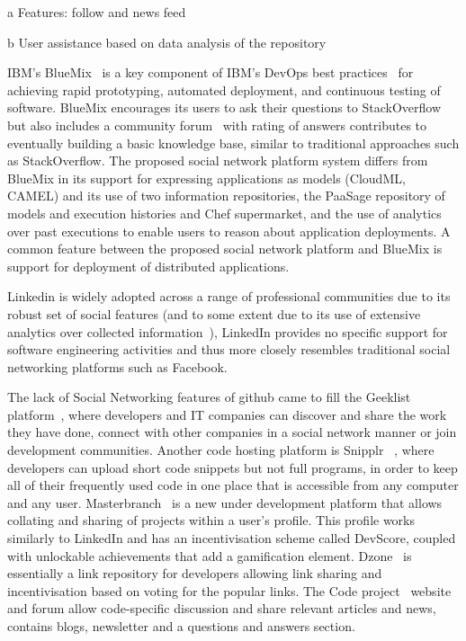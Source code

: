 \begin{table*}
\begin{threeparttable}
\begin{tabular}{c|c|c|c|c|c|c|c|c|c|cc}
\end{tabular}

\begin{tablenotes}
      \small
       \item[a] Features: follow and news feed
      \item[b] User assistance based on data analysis of the repository
\end{tablenotes}
\end{threeparttable}
\end{table*}

IBM's BlueMix~\cite{Bluemix-dev} is a key component of IBM's DevOps best practices~\cite{ibm-devops} for achieving rapid prototyping, automated deployment, and continuous testing of software. BlueMix encourages its users to ask their questions to StackOverflow but also includes a community forum~\cite{Bluemix-dev} with rating of answers contributes to eventually building a basic knowledge base, similar to traditional approaches such as StackOverflow.  The proposed social network platform system differs from BlueMix in its support for expressing applications as models (CloudML, CAMEL) and its use of two information repositories, the PaaSage repository of models and execution histories and Chef supermarket, and the use of analytics over past executions to enable users to reason about application deployments. A common feature between the proposed social network platform and BlueMix is support for deployment of distributed applications. 

Linkedin is widely adopted across a range of professional communities due to its robust set of social features (and to some extent due to its use of extensive analytics over collected information~\cite{sumbaly2013big}), LinkedIn provides no specific support for software engineering activities and thus more closely resembles traditional social networking platforms such as Facebook.

The lack of Social Networking features of github came to fill the Geeklist platform~\cite{geeklist_url}, where developers and IT companies can discover and share the work they have done, connect with other companies in a social network manner or join development communities. Another code hosting platform is Snipplr ~\cite{snipplr_url}, where developers can upload short code snippets but not full programs, in order to keep all of their frequently used code in one place that is accessible from any computer and any user. Masterbranch~\cite{masterbranch_url} is a new under development platform that allows collating and sharing of projects within a user's profile. This profile works similarly to LinkedIn and has an incentivisation scheme called DevScore, coupled with unlockable achievements that add a gamification element. Dzone~\cite{dzone_url} is essentially a link repository for developers allowing link sharing and incentivisation based on voting for the popular links. The Code project~\cite{codeproject_url} website and forum allow code-specific discussion and share relevant articles and news, contains blogs, newsletter and a questions and answers section.

